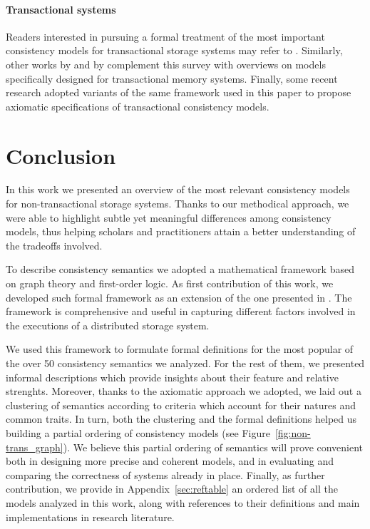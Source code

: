 \documentclass[letter, 11pt]{article}
\newcommand{\citeN}{\citet}
\renewcommand{\cite}{\citep}
\begin{document}
\paragraph*{Transactional systems}
Readers interested in pursuing a formal treatment of the most important
consistency models for transactional storage systems may refer to \cite{Adya:99}.
Similarly, other works by \citeN{Harris.ea:10} and by \citeN{Dziuma.Fatourou.ea:14}
complement this survey with overviews on models specifically designed for transactional memory systems.
Finally, some recent research \cite{Burckhardt.Leijen.ea:12,Cerone.Bernardi.ea:15}
adopted variants of the same framework used in this paper to propose 
axiomatic specifications of transactional consistency models.

 
\section{Conclusion}
\label{sec:conclusion}


In this work we presented an overview of the most relevant
consistency models for non-transactional storage systems.
Thanks to our methodical approach,
we were able to highlight subtle yet meaningful differences among 
consistency models, thus helping scholars and practitioners attain a
better understanding of the tradeoffs involved.

To describe consistency semantics we adopted a mathematical framework 
based on graph theory and first-order logic.
As first contribution of this work, we developed such formal framework as an extension 
of the one presented in \cite{Burckhardt:14}.
The framework is comprehensive and useful in capturing different factors involved in the executions of a  distributed storage system.

We used this framework to formulate formal definitions for the most popular of the over 50 consistency semantics we analyzed.
For the rest of them, we presented informal descriptions which provide insights about their feature and  relative strenghts.
Moreover, thanks to the axiomatic approach we adopted, we laid out a clustering of semantics according to criteria which account for their natures and common traits.
In turn, both the clustering and the formal definitions helped us building a partial ordering of consistency models (see Figure~\ref{fig:non-trans_graph}).
We believe this partial ordering of semantics will prove convenient both in designing more precise 
and coherent models, and in evaluating and comparing the correctness of systems already in place.
Finally, as further contribution, we provide in Appendix~\ref{sec:reftable} an ordered list of all the models analyzed in this work, along with references to 
their definitions and main implementations in research literature. 
\end{document}
